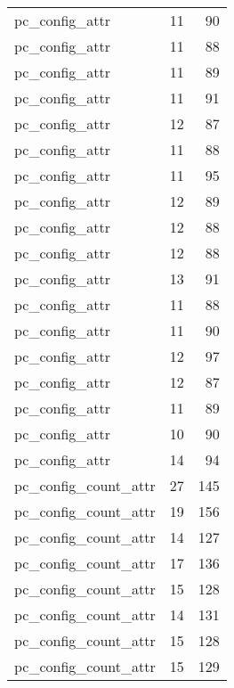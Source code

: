 \begin{table}
\begin{tabular}{lrr}
                  pc\_config\_attr &        11 &        90 \\
                  pc\_config\_attr &        11 &        88 \\
                  pc\_config\_attr &        11 &        89 \\
                  pc\_config\_attr &        11 &        91 \\
                  pc\_config\_attr &        12 &        87 \\
                  pc\_config\_attr &        11 &        88 \\
                  pc\_config\_attr &        11 &        95 \\
                  pc\_config\_attr &        12 &        89 \\
                  pc\_config\_attr &        12 &        88 \\
                  pc\_config\_attr &        12 &        88 \\
                  pc\_config\_attr &        13 &        91 \\
                  pc\_config\_attr &        11 &        88 \\
                  pc\_config\_attr &        11 &        90 \\
                  pc\_config\_attr &        12 &        97 \\
                  pc\_config\_attr &        12 &        87 \\
                  pc\_config\_attr &        11 &        89 \\
                  pc\_config\_attr &        10 &        90 \\
                  pc\_config\_attr &        14 &        94 \\
            pc\_config\_count\_attr &        27 &       145 \\
            pc\_config\_count\_attr &        19 &       156 \\
            pc\_config\_count\_attr &        14 &       127 \\
            pc\_config\_count\_attr &        17 &       136 \\
            pc\_config\_count\_attr &        15 &       128 \\
            pc\_config\_count\_attr &        14 &       131 \\
            pc\_config\_count\_attr &        15 &       128 \\
            pc\_config\_count\_attr &        15 &       129 \\

\end{tabular}
\end{table}
